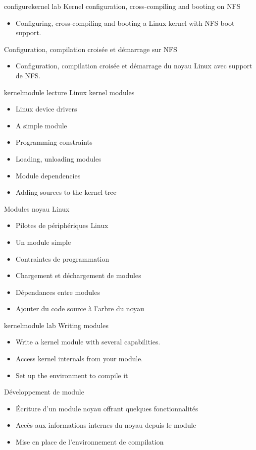{configurekernel}
{lab}
{Kernel configuration, cross-compiling and booting on NFS}
{
  \begin{itemize}
  \item Configuring, cross-compiling and booting a Linux kernel with
    NFS boot support.
  \end{itemize}
}
{Configuration, compilation croisée et démarrage sur NFS}
{
  \begin{itemize}
  \item Configuration, compilation croisée et démarrage du noyau Linux
    avec support de NFS.
  \end{itemize}
}
{kernelmodule}
{lecture}
{Linux kernel modules}
{
  \begin{itemize}
  \item Linux device drivers
  \item A simple module
  \item Programming constraints
  \item Loading, unloading modules
  \item Module dependencies
  \item Adding sources to the kernel tree
  \end{itemize}
}
{Modules noyau Linux}
{
  \begin{itemize}
  \item Pilotes de périphériques Linux
  \item Un module simple
  \item Contraintes de programmation
  \item Chargement et déchargement de modules
  \item Dépendances entre modules
  \item Ajouter du code source à l'arbre du noyau
  \end{itemize}
}
{kernelmodule}
{lab}
{Writing modules}
{
  \begin{itemize}
  \item Write a kernel module with several capabilities.
  \item Access kernel internals from your module.
  \item Set up the environment to compile it
  \end{itemize}
}
{Développement de module}
{
  \begin{itemize}
  \item Écriture d'un module noyau offrant quelques fonctionnalités
  \item Accès aux informations internes du noyau depuis le module
  \item Mise en place de l'environnement de compilation
  \end{itemize}
}
